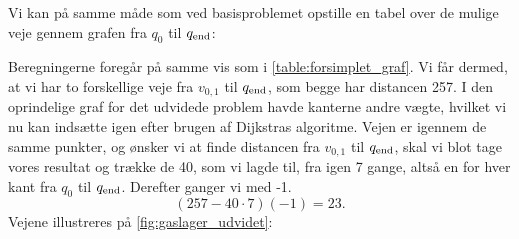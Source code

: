 Vi kan på samme måde som ved basisproblemet opstille en tabel over de mulige veje gennem grafen fra $q_0$ til $q_{\textrm{end}}$:

 


Beregningerne foregår på samme vis som i \autoref{table:forsimplet_graf}. Vi får dermed, at vi har to forskellige veje fra $v_{0,1}$ til $q_{\textrm{end}}$, som begge har distancen 257. I den oprindelige graf for det udvidede problem havde kanterne andre vægte, hvilket vi nu kan indsætte igen efter brugen af Dijkstras algoritme. Vejen er igennem de samme punkter, og ønsker vi at finde distancen fra $v_{0,1}$ til $q_{\textrm{end}}$, skal vi blot tage vores resultat og trække de 40, som vi lagde til, fra igen 7 gange, altså en for hver kant fra $q_{0}$ til $q_{\textrm{end}}$. Derefter ganger vi med -1.
\begin{equation}
(257-40 \cdot 7)(-1) = 23.
\end{equation}
Vejene illustreres på \autoref{fig:gaslager_udvidet}:



